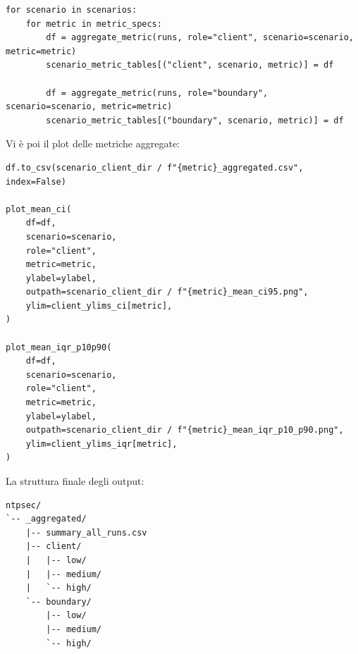 \begin{listing}[H]
\begin{verbatim}
for scenario in scenarios:
    for metric in metric_specs:
        df = aggregate_metric(runs, role="client", scenario=scenario, metric=metric)
        scenario_metric_tables[("client", scenario, metric)] = df

        df = aggregate_metric(runs, role="boundary", scenario=scenario, metric=metric)
        scenario_metric_tables[("boundary", scenario, metric)] = df
\end{verbatim}
\caption{Aggregazione separata delle metriche NTPsec per client e boundary.}
\label{lst:ntpsec-role-aggregation}
\end{listing}

Vi è poi il plot delle metriche aggregate:

\begin{listing}[H]
\begin{verbatim}
df.to_csv(scenario_client_dir / f"{metric}_aggregated.csv", index=False)

plot_mean_ci(
    df=df,
    scenario=scenario,
    role="client",
    metric=metric,
    ylabel=ylabel,
    outpath=scenario_client_dir / f"{metric}_mean_ci95.png",
    ylim=client_ylims_ci[metric],
)

plot_mean_iqr_p10p90(
    df=df,
    scenario=scenario,
    role="client",
    metric=metric,
    ylabel=ylabel,
    outpath=scenario_client_dir / f"{metric}_mean_iqr_p10_p90.png",
    ylim=client_ylims_iqr[metric],
)
\end{verbatim}
\caption{Produzione dei CSV aggregati e dei grafici per una metrica NTPsec.}
\label{lst:ntpsec-output-generation}
\end{listing}

La struttura finale degli output:

\begin{listing}[H]
\begin{verbatim}
ntpsec/
`-- _aggregated/
    |-- summary_all_runs.csv
    |-- client/
    |   |-- low/
    |   |-- medium/
    |   `-- high/
    `-- boundary/
        |-- low/
        |-- medium/
        `-- high/
\end{verbatim}
\caption{Organizzazione degli output aggregati prodotti dal parser NTPsec.}
\label{lst:ntpsec-output-structure}
\end{listing}